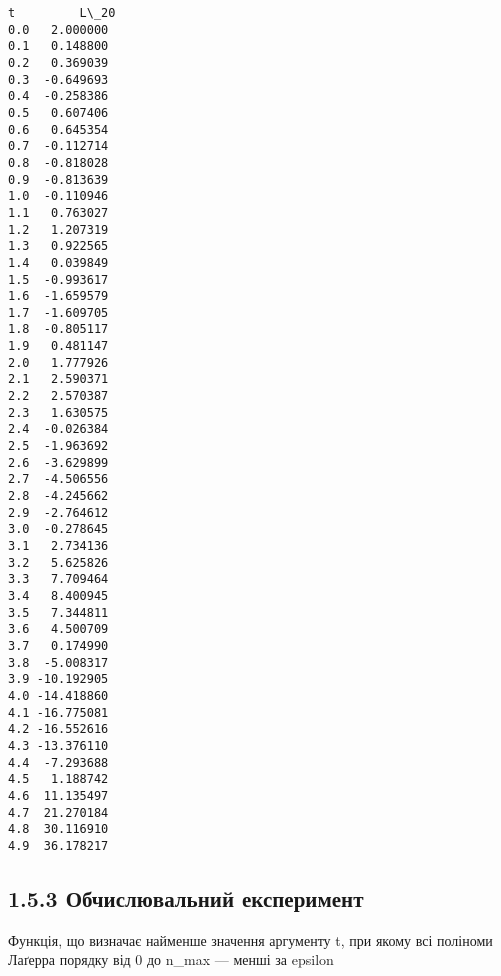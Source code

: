 \documentclass[11pt]{article}
\makeatletter
\newcommand{\boxspacing}{\kern\kvtcb@left@rule\kern\kvtcb@boxsep}
\newcommand{\prompt}[4]{
        {\ttfamily\llap{{\color{#2}[#3]:\hspace{3pt}#4}}\vspace{-\baselineskip}}
    }
\makeatother
\begin{document}
\begin{tcolorbox}[breakable, size=fbox, boxrule=.5pt, pad at break*=1mm, opacityfill=0]
	\prompt{Out}{outcolor}{199}{\boxspacing}
	\begin{Verbatim}[commandchars=\\\{\}]
t         L\_20
0.0   2.000000
0.1   0.148800
0.2   0.369039
0.3  -0.649693
0.4  -0.258386
0.5   0.607406
0.6   0.645354
0.7  -0.112714
0.8  -0.818028
0.9  -0.813639
1.0  -0.110946
1.1   0.763027
1.2   1.207319
1.3   0.922565
1.4   0.039849
1.5  -0.993617
1.6  -1.659579
1.7  -1.609705
1.8  -0.805117
1.9   0.481147
2.0   1.777926
2.1   2.590371
2.2   2.570387
2.3   1.630575
2.4  -0.026384
2.5  -1.963692
2.6  -3.629899
2.7  -4.506556
2.8  -4.245662
2.9  -2.764612
3.0  -0.278645
3.1   2.734136
3.2   5.625826
3.3   7.709464
3.4   8.400945
3.5   7.344811
3.6   4.500709
3.7   0.174990
3.8  -5.008317
3.9 -10.192905
4.0 -14.418860
4.1 -16.775081
4.2 -16.552616
4.3 -13.376110
4.4  -7.293688
4.5   1.188742
4.6  11.135497
4.7  21.270184
4.8  30.116910
4.9  36.178217
	\end{Verbatim}
\end{tcolorbox}
\newpage     
\subsection*{1.5.3 Обчислювальний
	експеримент}\label{ux43eux431ux447ux438ux441ux43bux44eux432ux430ux43bux44cux43dux438ux439-ux435ux43aux441ux43fux435ux440ux438ux43cux435ux43dux442}

Функція, що визначає найменше значення аргументу t, при якому всі
поліноми Лаґерра порядку від 0 до n\_max --- менші за epsilon
\end{document}
